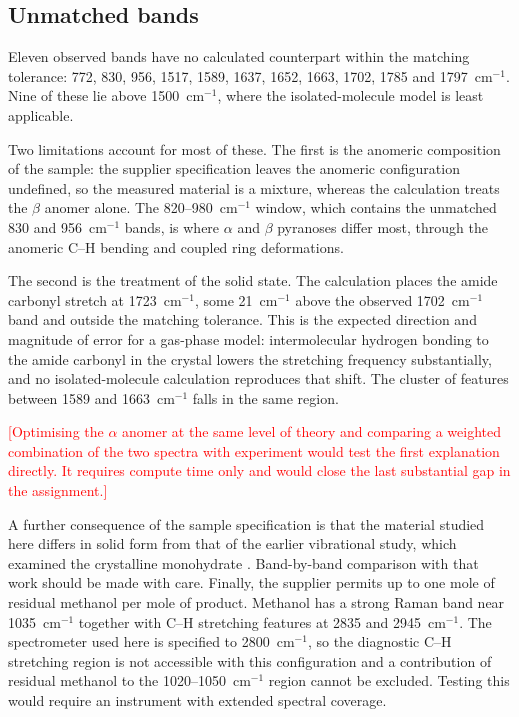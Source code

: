 \documentclass[11pt,a4paper]{article}
\newcommand{\wn}{\ensuremath{\mathrm{cm}^{-1}}}
\newcommand{\authorcheck}[1]{\textcolor{red}{[#1]}}
\begin{document}
\subsection{Unmatched bands}
\label{sec:unmatched}

Eleven observed bands have no calculated counterpart within the matching
tolerance: 772, 830, 956, 1517, 1589, 1637, 1652, 1663, 1702, 1785 and
1797~\wn{}. Nine of these lie above 1500~\wn{}, where the isolated-molecule
model is least applicable.

Two limitations account for most of these. The first is the anomeric composition
of the sample: the supplier specification leaves the anomeric configuration
undefined, so the measured material is a mixture, whereas the calculation treats
the $\beta$ anomer alone. The 820--980~\wn{} window, which contains the
unmatched 830 and 956~\wn{} bands, is where $\alpha$ and $\beta$ pyranoses
differ most, through the anomeric C--H bending and coupled ring deformations.

The second is the treatment of the solid state. The calculation places the amide
carbonyl stretch at 1723~\wn{}, some 21~\wn{} above the observed 1702~\wn{}
band and outside the matching tolerance. This is the expected direction and
magnitude of error for a gas-phase model: intermolecular hydrogen bonding to the
amide carbonyl in the crystal lowers the stretching frequency substantially, and
no isolated-molecule calculation reproduces that shift. The cluster of features
between 1589 and 1663~\wn{} falls in the same region.

\authorcheck{Optimising the $\alpha$ anomer at the same level of theory and
comparing a weighted combination of the two spectra with experiment would test
the first explanation directly. It requires compute time only and would close
the last substantial gap in the assignment.}

A further consequence of the sample specification is that the material studied
here differs in solid form from that of the earlier vibrational study, which
examined the crystalline monohydrate \cite{kouach1994}. Band-by-band comparison
with that work should be made with care. Finally, the supplier permits up to one
mole of residual methanol per mole of product. Methanol has a strong Raman band
near 1035~\wn{} together with C--H stretching features at 2835 and 2945~\wn{}.
The spectrometer used here is specified to 2800~\wn{}, so the diagnostic C--H
stretching region is not accessible with this configuration and a contribution
of residual methanol to the 1020--1050~\wn{} region cannot be excluded. Testing
this would require an instrument with extended spectral coverage.
\end{document}
